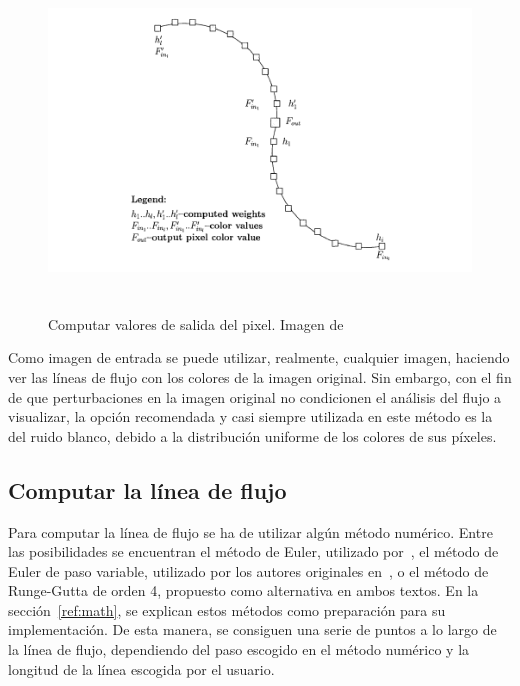 \begin{figure}
		\centering
		\includegraphics[height=9cm]{figures/licoutputpixel.png}
		\caption{Computar valores de salida del pixel. Imagen de~\citet{licthesis}}	
		\label{fig:licoutputpixel}
\end{figure}

Como imagen de entrada se puede utilizar, realmente, cualquier imagen,
haciendo ver las líneas de flujo con los colores de la imagen original. Sin
embargo, con el fin de que perturbaciones en la imagen original no condicionen
el análisis del flujo a visualizar, la opción recomendada y casi siempre
utilizada en este método es la del ruido blanco, debido a la distribución
uniforme de los colores de sus píxeles. \\

\subsection{Computar la línea de flujo}
\label{ref:streamline}

Para computar la línea de flujo se ha de utilizar algún método numérico. Entre
las posibilidades se encuentran el método de Euler, utilizado
por~\citet{licthesis}, el método de Euler de paso variable, utilizado por los
autores originales en~\citet{osti_10185520}, o el método de Runge-Gutta de orden
4, propuesto como alternativa en ambos textos. En la sección~\ref{ref:math}, se
explican estos métodos como preparación para su implementación. De esta manera,
se consiguen una serie de puntos a lo largo de la línea de flujo, dependiendo
del paso escogido en el método numérico y la longitud de la línea escogida por
el usuario.

